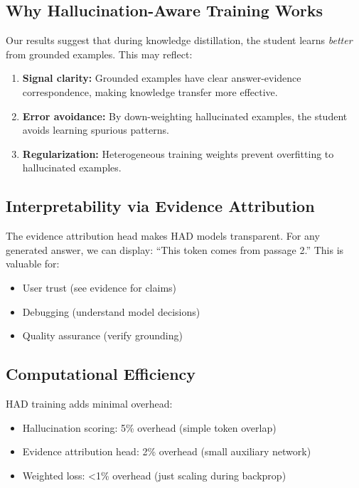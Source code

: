 \documentclass[11pt,a4paper]{article}
\begin{document}
\subsection{Why Hallucination-Aware Training Works}

Our results suggest that during knowledge distillation, the student learns \textit{better} from grounded examples. This may reflect:

\begin{enumerate}
    \item \textbf{Signal clarity:} Grounded examples have clear answer-evidence correspondence, making knowledge transfer more effective.
    \item \textbf{Error avoidance:} By down-weighting hallucinated examples, the student avoids learning spurious patterns.
    \item \textbf{Regularization:} Heterogeneous training weights prevent overfitting to hallucinated examples.
\end{enumerate}

\subsection{Interpretability via Evidence Attribution}

The evidence attribution head makes HAD models transparent. For any generated answer, we can display: ``This token comes from passage 2.'' This is valuable for:
\begin{itemize}
    \item User trust (see evidence for claims)
    \item Debugging (understand model decisions)
    \item Quality assurance (verify grounding)
\end{itemize}

\subsection{Computational Efficiency}

HAD training adds minimal overhead:
\begin{itemize}
    \item Hallucination scoring: 5\% overhead (simple token overlap)
    \item Evidence attribution head: 2\% overhead (small auxiliary network)
    \item Weighted loss: <1\% overhead (just scaling during backprop)
\end{itemize}
\end{document}
